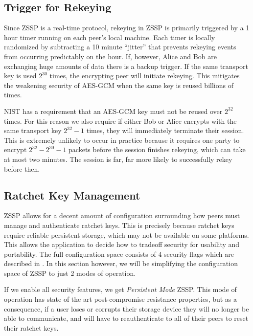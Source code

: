 \documentclass{article}
\begin{document}
\subsection{Trigger for Rekeying}

Since ZSSP is a real-time protocol, rekeying in ZSSP is primarily triggered by a 1 hour timer running on each peer's local machine. Each timer is locally randomized by subtracting a 10 minute ``jitter'' that prevents rekeying events from occurring predictably on the hour. If, however, Alice and Bob are exchanging huge amounts of data there is a backup trigger. If the same transport key is used $2^{30}$ times, the encrypting peer will initiate rekeying. This mitigates the weakening security of AES-GCM when the same key is reused billions of times.

NIST has a requirement that an AES-GCM key must not be reused over $2^{32}$ times. For this reason we also require if either Bob or Alice encrypts with the same transport key $2^{32} - 1$ times, they will immediately terminate their session. This is extremely unlikely to occur in practice because it requires one party to encrypt $2^{32} - 2^{30} - 1$ packets before the session finishes rekeying, which can take at most two minutes. The session is far, far more likely to successfully rekey before then.

\subsection{Ratchet Key Management}\label{sec:key_management}

ZSSP allows for a decent amount of configuration surrounding how peers must manage and authenticate ratchet keys. This is precisely because ratchet keys require reliable persistent storage, which may not be available on some platforms. This allows the application to decide how to tradeoff security for usability and portability. The full configuration space consists of 4 security flags which are described in . In this section however, we will be simplifying the configuration space of ZSSP to just 2 modes of operation.

If we enable all security features, we get \emph{Persistent Mode} ZSSP. This mode of operation has state of the art post-compromise resistance properties, but as a consequence, if a user loses or corrupts their storage device they will no longer be able to communicate, and will have to reauthenticate to all of their peers to reset their ratchet keys.
\end{document}

